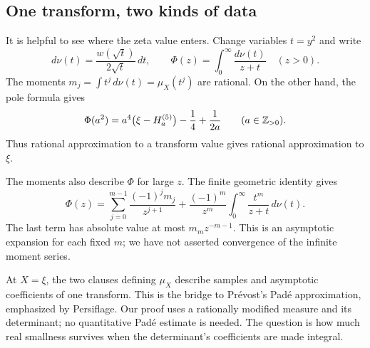 \subsection{One transform, two kinds of data}

It is helpful to see where the zeta value enters.
Change variables \(t=y^2\) and write
\[
 d\nu(t)=\frac{w(\sqrt t)}{2\sqrt t}\,dt,\qquad
 \Phi(z)=\int_0^\infty\frac{d\nu(t)}{z+t}\quad(z>0).
\]
The moments \(m_j=\int t^j\,d\nu(t)=\mu_X(t^j)\) are rational.
On the other hand, the pole formula gives
\[
 \Phi(a^2)=a^4\bigl(\xi-H_a^{(5)}\bigr)-\frac14+\frac1{2a}
 \qquad(a\in\mathbb Z_{>0}).
\]
Thus rational approximation to a transform value gives rational
approximation to \(\xi\).

The moments also describe \(\Phi\) for large \(z\).
The finite geometric identity gives
\[
 \Phi(z)=\sum_{j=0}^{m-1}\frac{(-1)^jm_j}{z^{j+1}}
  +\frac{(-1)^m}{z^m}\int_0^\infty\frac{t^m}{z+t}\,d\nu(t).
\]
The last term has absolute value at most \(m_m z^{-m-1}\).
This is an asymptotic expansion for each fixed \(m\); we have not asserted
convergence of the infinite moment series.

At \(X=\xi\), the two clauses defining \(\mu_X\) describe samples and
asymptotic coefficients of one transform. This is the bridge to
Pr\'evost's Pad\'e approximation, emphasized by Persiflage.
Our proof uses a rationally modified measure and its determinant;
no quantitative Pad\'e estimate is needed. The question is how much
real smallness survives when the determinant's coefficients are made
integral.
